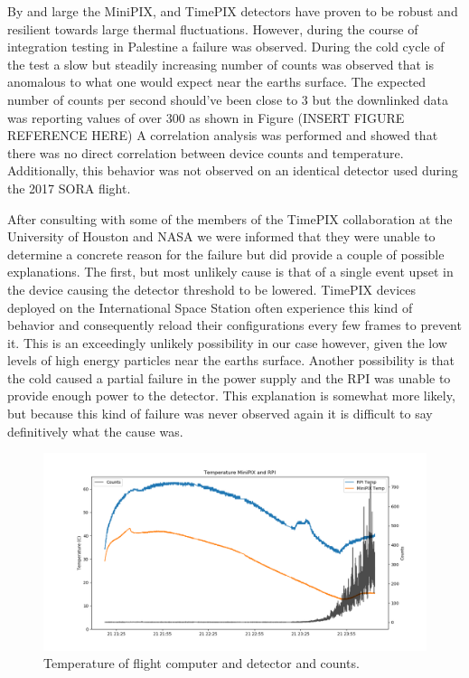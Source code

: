 By and large the MiniPIX, and TimePIX detectors have proven to be robust and resilient towards large thermal fluctuations. However, during the course of integration testing in Palestine a failure was observed. During the cold cycle of the test a slow but steadily increasing number of counts was observed that is anomalous to what one would expect near the earths surface. The expected number of counts per second should've been close to 3 but the downlinked data was reporting values of over 300 as shown in Figure (INSERT FIGURE REFERENCE HERE)
A correlation analysis was performed and showed that there was no direct correlation between device counts and temperature. Additionally, this behavior was not observed on an identical detector used during the 2017 SORA flight. 

After consulting with some of the members of the TimePIX collaboration at the University of Houston and NASA we were informed that they were unable to determine a concrete reason for the failure but did provide a couple of possible explanations. The first, but most unlikely cause is that of a single event upset in the device causing the detector threshold to be lowered. TimePIX devices deployed on the International Space Station often experience this kind of behavior and consequently reload their configurations every few frames to prevent it. This is an exceedingly unlikely possibility in our case however, given the low levels of high energy particles near the earths surface. Another possibility is that the cold caused a partial failure in the power supply and the RPI was unable to provide enough power to the detector. This explanation is somewhat more likely, but because this kind of failure was never observed again it is difficult to say definitively what the cause was.

\begin{figure}[h!]
	\begin{center}
	\includegraphics[width=\textwidth]{figures/tempsandcountsvtime.png}
	\caption{Temperature of flight computer and detector and counts.}
	\label{integrationtemps}
	\end{center}
\end{figure}
